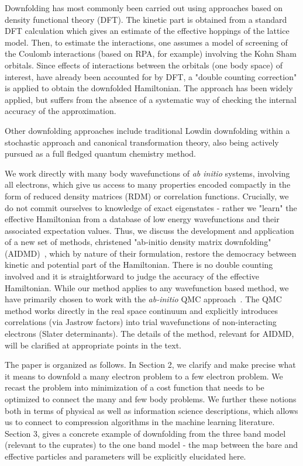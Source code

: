 \documentclass[prl,12pt,onecolumn,nofootinbib,notitlepage,english,superscriptaddress]{revtex4-1}
\begin{document}
Downfolding has most commonly been carried out using approaches based on density functional theory (DFT). 
The kinetic part is obtained from a standard 
DFT calculation which gives an estimate of the effective hoppings of the lattice model. 
Then, to estimate the interactions, one assumes a model of screening of the Coulomb interactions 
(based on RPA, for example) involving the Kohn Sham orbitals. Since effects of interactions 
between the orbitals (one body space) of interest, have already been accounted for by DFT, a 
"double counting correction" is applied to obtain the downfolded Hamiltonian. 
The approach has been widely applied, but suffers from the absence of a systematic way of checking 
the internal accuracy of the approximation.

Other downfolding approaches include traditional Lowdin downfolding 
within a stochastic approach and canonical transformation theory, 
also being actively pursued as a full fledged quantum chemistry method. 

We work directly with many body wavefunctions of \emph{ab initio} systems, involving all electrons, 
which give us access to many properties encoded compactly in the form of reduced 
density matrices (RDM) or correlation functions. Crucially, we do not commit ourselves to 
knowledge of exact eigenstates - rather we "learn" the effective Hamiltonian from a database of 
low energy wavefunctions and their associated expectation values. 
Thus, we discuss the development and application 
of a new set of methods, christened "ab-initio density matrix downfolding" (AIDMD)~\cite{Changlani2015},
which by nature of their formulation, restore the democracy between kinetic and 
potential part of the Hamiltonian. There is no double counting involved and it is straightforward 
to judge the accuracy of the effective Hamiltonian. While our method applies to any wavefunction based method, 
we have primarily chosen to work with the \emph{ab-initio} QMC approach~\cite{Ceperley_Alder,Foulkes_review}. 
The QMC method works directly in the real space continuum and explicitly introduces correlations (via Jastrow factors) 
into trial wavefunctions of non-interacting electrons (Slater determinants). 
The details of the method, relevant for AIDMD, will be clarified at appropriate points 
in the text. 

The paper is organized as follows. In Section 2, we clarify and make precise what it means to downfold 
a many electron problem to a few electron problem. We recast the problem into minimization 
of a cost function that needs to be optimized to connect the many and few body problems. We further 
these notions both in terms of physical as well as information science descriptions, which allows us to connect to 
compression algorithms in the machine learning literature. Section 3, gives a concrete example of downfolding from 
the three band model (relevant to the cuprates) to the one band model - the map between the bare and 
effective particles and parameters will be explicitly elucidated here.  
\end{document}
